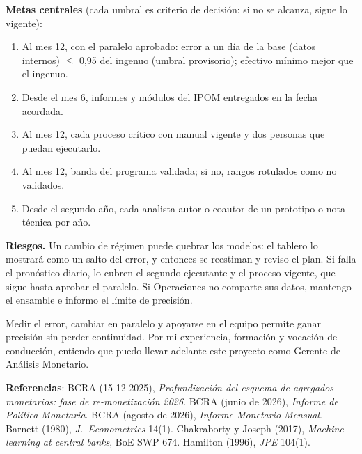 \documentclass[11pt,a4paper]{article}
\begin{document}
\textbf{Metas centrales} (cada umbral es criterio de decisión: si no se alcanza, sigue lo vigente):
\begin{enumerate}[itemsep=0pt]
\item Al mes 12, con el paralelo aprobado: error a un día de la base (datos internos) $\leq$ 0,95 del ingenuo (umbral provisorio); efectivo mínimo mejor que el ingenuo.
\item Desde el mes 6, informes y módulos del IPOM entregados en la fecha acordada.
\item Al mes 12, cada proceso crítico con manual vigente y dos personas que puedan ejecutarlo.
\item Al mes 12, banda del programa validada; si no, rangos rotulados como no validados.
\item Desde el segundo año, cada analista autor o coautor de un prototipo o nota técnica por año.
\end{enumerate}

\textbf{Riesgos.} Un cambio de régimen puede quebrar los modelos: el tablero lo mostrará como un salto del error, y entonces se reestiman y reviso el plan. Si falla el pronóstico diario, lo cubren el segundo ejecutante y el proceso vigente, que sigue hasta aprobar el paralelo. Si Operaciones no comparte sus datos, mantengo el ensamble e informo el límite de precisión.

Medir el error, cambiar en paralelo y apoyarse en el equipo permite ganar precisión sin perder continuidad. Por mi experiencia, formación y vocación de conducción, entiendo que puedo llevar adelante este proyecto como Gerente de Análisis Monetario.

\small
\textbf{Referencias}: BCRA (15-12-2025), \emph{Profundización del esquema de agregados monetarios: fase de re-monetización 2026}. BCRA (junio de 2026), \emph{Informe de Política Monetaria}. BCRA (agosto de 2026), \emph{Informe Monetario Mensual}. Barnett (1980), \emph{J.\ Econometrics} 14(1). Chakraborty y Joseph (2017), \emph{Machine learning at central banks}, BoE SWP 674. Hamilton (1996), \emph{JPE} 104(1).

\clearpage
\setlength{\emergencystretch}{3em}
\renewcommand{\topfraction}{0.9}\renewcommand{\bottomfraction}{0.8}
\renewcommand{\textfraction}{0.07}\renewcommand{\floatpagefraction}{0.8}
\setcounter{totalnumber}{4}\setcounter{topnumber}{3}
\makeatletter{}    \makeatother
\captionsetup[figure]{position=top}
\captionsetup[table]{position=top}

\end{document}
